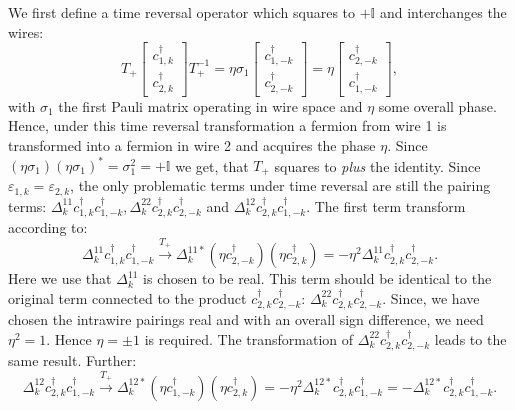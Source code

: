 We first define a time reversal operator which squares to $ + \mathbb{I}$ and interchanges the wires: 
\begin{equation}
T_+\begin{bmatrix} c^\dagger_{1,k} \\ c^\dagger_{2,k} \end{bmatrix} T_+^{-1} = \eta\sigma_1 \begin{bmatrix} c^\dagger_{1,-k} \\ c^\dagger_{2,-k} \end{bmatrix} = \eta\begin{bmatrix} c^\dagger_{2,-k} \\ c^\dagger_{1,-k} \end{bmatrix},\nonumber
\end{equation} 
with $\sigma_1$ the first Pauli matrix operating in wire space and $\eta$ some overall phase. Hence, under this time reversal transformation a fermion from wire 1 is transformed into a fermion in wire 2 and acquires the phase $\eta$. Since $(\eta\sigma_1)(\eta\sigma_1)^* = \sigma_1^2 = + \mathbb{I}$ we get, that $T_+$ squares to \textit{plus} the identity. Since $\varepsilon_{1,k} = \varepsilon_{2,k}$, the only problematic terms under time reversal are still the pairing terms: $\Delta^{11}_k c^\dagger_{1,k}c^\dagger_{1,-k}, \Delta^{22}_k c^\dagger_{2,k}c^\dagger_{2,-k}$ and $\Delta^{12}_kc^\dagger_{2,k}c^\dagger_{1,-k}$. The first term transform according to:
\begin{equation}
\Delta^{11}_k c^\dagger_{1,k}c^\dagger_{1,-k} \overset{T_+}{\to} \Delta^{11*}_k \left(\eta c^\dagger_{2,-k}\right)\left(\eta c^\dagger_{2,k}\right) = -\eta^2\Delta^{11}_k c^\dagger_{2,k}c^\dagger_{2,-k}. \nonumber
\end{equation}
Here we use that $\Delta^{11}_k$ is chosen to be real. This term should be identical to the original term connected to the product $c^\dagger_{2,k}c^\dagger_{2,-k}$: $\Delta^{22}_k c^\dagger_{2,k}c^\dagger_{2,-k}$. Since, we have chosen the intrawire pairings real and with an overall sign difference, we need $\eta^2 = 1$. Hence $\eta = \pm 1$ is required. The transformation of $\Delta^{22}_k c^\dagger_{2,k}c^\dagger_{2,-k}$ leads to the same result. Further:
\begin{equation}
\Delta^{12}_k c^\dagger_{2,k}c^\dagger_{1,-k} \overset{T_+}{\to} \Delta^{12*}_k \left(\eta c^\dagger_{1,-k}\right)\left( \eta c^\dagger_{2,k}\right) = -\eta^2 \Delta^{12*}_k c^\dagger_{2,k}c^\dagger_{1,-k} = - \Delta^{12*}_k c^\dagger_{2,k}c^\dagger_{1,-k}. \nonumber
\end{equation}

